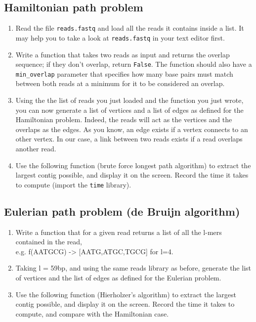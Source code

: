 \documentclass[a4paper,11pt]{article}
\begin{document}
\subsection{Hamiltonian path problem}
\begin{enumerate}
\item Read the file \texttt{reads.fastq} and load all the reads it contains inside a list. It may help you to take a look at \texttt{reads.fastq} in your text editor first.
\item Write a function that takes two reads as input and returns the overlap sequence; if they don't overlap, return \texttt{False}. The function should also have a \texttt{min\_overlap} parameter that specifies how many base pairs must match between both reads at a minimum for it to be considered an overlap.
\item Using the the list of reads you just loaded and the function you just wrote, you can now generate a list of vertices and a list of edges as defined for the Hamiltonian problem. Indeed, the reads will act as the vertices and the overlaps as the edges. As you know, an edge exists if a vertex connects to an other vertex. In our case, a link between two reads exists if a read overlaps another read.
\item Use the following function (brute force longest path algorithm) to extract the largest contig possible, and display it on the screen. Record the time it takes to compute (import the \texttt{time} library).
\end{enumerate}

\subsection{Eulerian path problem (de Bruijn algorithm)}
\begin{enumerate}
\item Write a function that for a given read returns a list of all the l-mers contained in the read, \\
e.g. f(AATGCG) ->  [AATG,ATGC,TGCG] for l=4.
\item Taking l = 59bp, and using the same reads library as before, generate the list of vertices and the list of edges as defined for the Eulerian problem.
\item Use the following function (Hierholzer's algorithm) to extract the largest contig possible, and display it on the screen. Record the time it takes to compute, and compare with the Hamiltonian case.
\end{enumerate}
\end{document}
